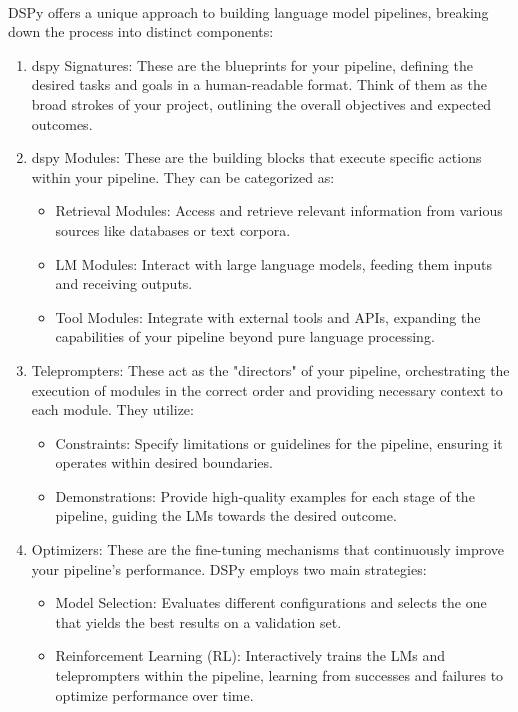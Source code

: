 \\
DSPy offers a unique approach to building language model pipelines, breaking down the process into distinct components:
\begin{enumerate}
    \item dspy Signatures: These are the blueprints for your pipeline, defining the desired tasks and goals in a human-readable format. Think of them as the broad strokes of your project, outlining the overall objectives and expected outcomes.
    \item dspy Modules: These are the building blocks that execute specific actions within your pipeline. They can be categorized as:
    \begin{itemize}
        \item Retrieval Modules: Access and retrieve relevant information from various sources like databases or text corpora.
        \item LM Modules: Interact with large language models, feeding them inputs and receiving outputs.
        \item Tool Modules: Integrate with external tools and APIs, expanding the capabilities of your pipeline beyond pure language processing.
    \end{itemize}
    \item Teleprompters: These act as the "directors" of your pipeline, orchestrating the execution of modules in the correct order and providing necessary context to each module. They utilize:
    \begin{itemize}
        \item Constraints: Specify limitations or guidelines for the pipeline, ensuring it operates within desired boundaries.
        \item Demonstrations: Provide high-quality examples for each stage of the pipeline, guiding the LMs towards the desired outcome.
    \end{itemize}
    \item Optimizers: These are the fine-tuning mechanisms that continuously improve your pipeline's performance. DSPy employs two main strategies:
    \begin{itemize}
        \item Model Selection: Evaluates different configurations and selects the one that yields the best results on a validation set.
        \item Reinforcement Learning (RL): Interactively trains the LMs and teleprompters within the pipeline, learning from successes and failures to optimize performance over time.
    \end{itemize}
\end{enumerate}
